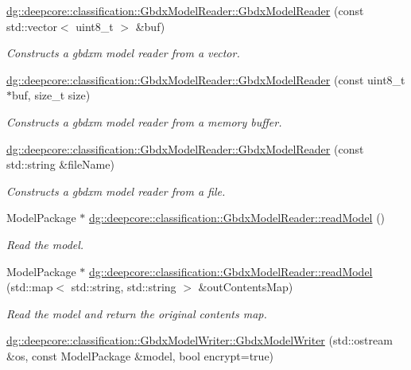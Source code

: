 \begin{DoxyCompactItemize}
\hyperlink{group___classification_module_ga3253da2225ab14f864894af9ddea77db}{dg\+::deepcore\+::classification\+::\+Gbdx\+Model\+Reader\+::\+Gbdx\+Model\+Reader} (const std\+::vector$<$ uint8\+\_\+t $>$ \&buf)
\begin{DoxyCompactList}\small\item\em Constructs a gbdxm model reader from a vector. \end{DoxyCompactList}\item 
\hyperlink{group___classification_module_ga5f5b18f2c2c2349d68cf670d8f7ea3ec}{dg\+::deepcore\+::classification\+::\+Gbdx\+Model\+Reader\+::\+Gbdx\+Model\+Reader} (const uint8\+\_\+t $\ast$buf, size\+\_\+t size)
\begin{DoxyCompactList}\small\item\em Constructs a gbdxm model reader from a memory buffer. \end{DoxyCompactList}\item 
\hyperlink{group___classification_module_ga1a936c6873d8a865411691d42d37ca28}{dg\+::deepcore\+::classification\+::\+Gbdx\+Model\+Reader\+::\+Gbdx\+Model\+Reader} (const std\+::string \&file\+Name)
\begin{DoxyCompactList}\small\item\em Constructs a gbdxm model reader from a file. \end{DoxyCompactList}\item 
Model\+Package $\ast$ \hyperlink{group___classification_module_gac674f549aa5900b6b07a1be95eac7564}{dg\+::deepcore\+::classification\+::\+Gbdx\+Model\+Reader\+::read\+Model} ()
\begin{DoxyCompactList}\small\item\em Read the model. \end{DoxyCompactList}\item 
Model\+Package $\ast$ \hyperlink{group___classification_module_ga64604bec40c4e4906abe110671ad8e01}{dg\+::deepcore\+::classification\+::\+Gbdx\+Model\+Reader\+::read\+Model} (std\+::map$<$ std\+::string, std\+::string $>$ \&out\+Contents\+Map)
\begin{DoxyCompactList}\small\item\em Read the model and return the original contents map. \end{DoxyCompactList}\item 
\hyperlink{group___classification_module_ga783393c4251282622db262338581da20}{dg\+::deepcore\+::classification\+::\+Gbdx\+Model\+Writer\+::\+Gbdx\+Model\+Writer} (std\+::ostream \&os, const Model\+Package \&model, bool encrypt=true)

\end{DoxyCompactItemize}
